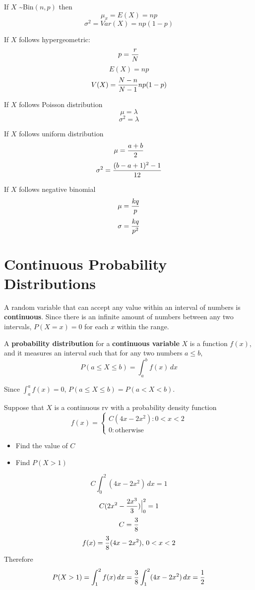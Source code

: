 \documentclass[english, 12pt]{article}
\begin{document}
If $X$ \textasciitilde Bin$(n,p)$ then
\[\mu_{x} = E(X) = np\]
\[\sigma^2 = Var(X) = np(1-p)\]

If $X$ follows hypergeometric:
\[p = \frac{r}{N}\]
\[E(X) = np\]
\[V(X) = \frac{N-n}{N-1} np(1-p)\]

If $X$ follows Poisson distribution
\[\mu = \lambda\]
\[\sigma^2 = \lambda\]


If $X$ follows uniform distribution
\[\mu = \frac{a+b}{2}\]
\[\sigma^2 = \frac{(b-a+1)^2 - 1}{12}\]

If $X$ follows negative binomial
\[\mu = \frac{kq}{p}\]
\[\sigma = \frac{kq}{p^2}\]


\section{Continuous Probability Distributions}

\begin{defn}
A random variable that can accept any value within an interval of numbers is \textbf{continuous}. Since there is an infinite amount of numbers between any two intervals, $P(X=x) = 0$ for each $x$ within the range.
\end{defn}

\begin{defn}
A \textbf{probability distribution} for a \textbf{continuous variable} $X$ is a function $f(x)$, and it measures an interval such that for any two numbers $a \leq b$,
\[P(a \leq X \leq b) = \int_a^b f(x)\,dx\]
\end{defn}

\begin{note}
Since $\int_a^a f(x) = 0$, $P(a \leq X \leq b) = P(a < X < b)$.
\end{note}

\begin{exmp}
Suppose that $X$ is a continuous rv with a probability density function
\begin{displaymath}
   f(x) = \left\{
     \begin{array}{lr}
       C(4x-2x^2) : 0 < x < 2 \\
       0 : \text{otherwise}
     \end{array}
   \right.
\end{displaymath}
\begin{itemize}
\item Find the value of $C$
\item Find $P(X > 1)$
\end{itemize}

\begin{sol}
\[C \int_0^2 (4x -2x^2)\,dx = 1\]
\[C (2x^2 - \frac{2x^3}{3})\Big|_0^2 = 1\]
\[C = \frac{3}{8}\]
\[f(x)=\frac{3}{8}(4x-2x^2),\,0<x<2\]
Therefore
\[P (X > 1) = \int_1^2 f(x)\,dx = \frac{3}{8} \int_1^2 (4x - 2x^2)\,dx = \frac{1}{2}\]
\end{sol}
\end{exmp}
\end{document}

